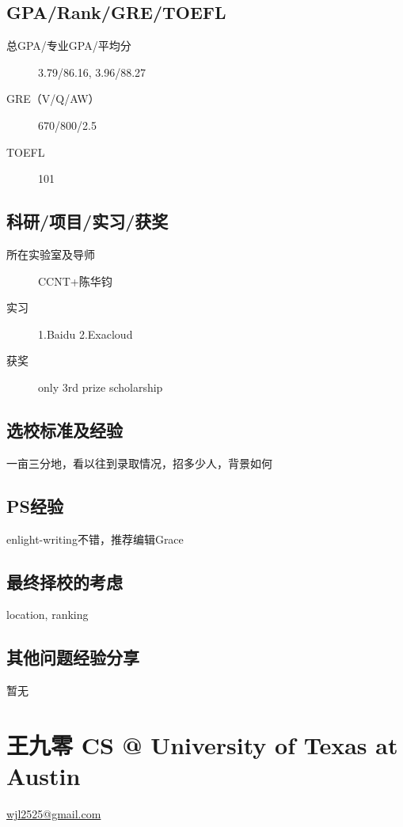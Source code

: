 \documentclass[11pt,fleqn,openany]{book} %
\begin{document}
\subsection*{GPA/Rank/GRE/TOEFL}
\begin{description}
\item[总GPA/专业GPA/平均分] 3.79/86.16, 3.96/88.27
\item[GRE（V/Q/AW）] 670/800/2.5
\item[TOEFL] 101
\end{description}

\subsection*{科研/项目/实习/获奖}
\begin{description}
\item[所在实验室及导师] CCNT+陈华钧
\item[实习] 1.Baidu
2.Exacloud
\item[获奖] only 3rd prize scholarship
\end{description}
\subsection*{选校标准及经验}
一亩三分地，看以往到录取情况，招多少人，背景如何
\subsection*{PS经验}
enlight-writing不错，推荐编辑Grace
\subsection*{最终择校的考虑}
location, ranking
\subsection*{其他问题经验分享}
暂无
\clearpage
\section{王九零 CS @ University of Texas at Austin}
\hfill \href{mailto:wjl2525@gmail.com}{wjl2525@gmail.com}
\end{document}
